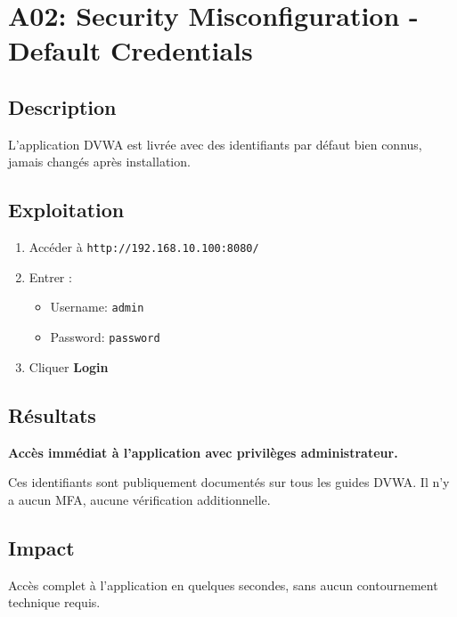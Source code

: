\documentclass[12pt,a4paper,openany]{report}
\begin{document}
	\section{A02: Security Misconfiguration - Default Credentials}
	
	\subsection{Description}
	
	L'application DVWA est livrée avec des identifiants par défaut bien connus, 
	jamais changés après installation.
	
	\subsection{Exploitation}
	
	\begin{enumerate}
		\item Accéder à \texttt{http://192.168.10.100:8080/}
		\item Entrer :
		\begin{itemize}
			\item Username: \texttt{admin}
			\item Password: \texttt{password}
		\end{itemize}
		\item Cliquer \textbf{Login}
	\end{enumerate}
	
	\subsection{Résultats}
	
	\textbf{Accès immédiat à l'application avec privilèges administrateur.}
	
	Ces identifiants sont publiquement documentés sur tous les guides DVWA. 
	Il n'y a aucun MFA, aucune vérification additionnelle.
	
	\subsection{Impact}
	
	\begin{tcolorbox}[colback=criticalred!10!white, colframe=criticalred, 
		title=\textbf{CRITICITÉ: CRITIQUE}]
		Accès complet à l'application en quelques secondes, sans aucun contournement technique requis.
	\end{tcolorbox}
	
\end{document}
